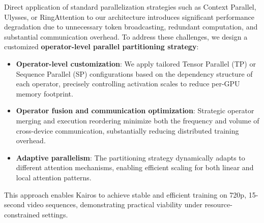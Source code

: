Direct application of standard parallelization strategies such as Context Parallel, Ulysses, or RingAttention to our architecture introduces significant performance degradation due to unnecessary token broadcasting, redundant computation, and substantial communication overhead. To address these challenges, we design a customized \textbf{operator-level parallel partitioning strategy}:
\begin{itemize}
    \item \textbf{Operator-level customization}: We apply tailored Tensor Parallel (TP) or Sequence Parallel (SP) configurations based on the dependency structure of each operator, precisely controlling activation scales to reduce per-GPU memory footprint.
    \item \textbf{Operator fusion and communication optimization}: Strategic operator merging and execution reordering minimize both the frequency and volume of cross-device communication, substantially reducing distributed training overhead.
    \item \textbf{Adaptive parallelism}: The partitioning strategy dynamically adapts to different attention mechanisms, enabling efficient scaling for both linear and local attention patterns.
\end{itemize}

This approach enables Kairos to achieve stable and efficient training on 720p, 15-second video sequences, demonstrating practical viability under resource-constrained settings.

